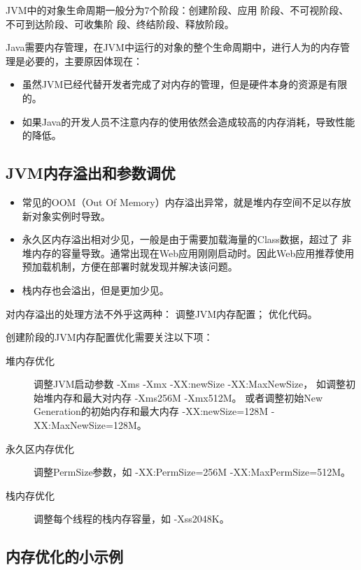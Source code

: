 JVM中的对象生命周期一般分为7个阶段：创建阶段、应用
阶段、不可视阶段、不可到达阶段、可收集阶
段、终结阶段、释放阶段。

Java需要内存管理，在JVM中运行的对象的整个生命周期中，进行人为的内存管理是必要的，主要原因体现在：

\begin{itemize}
\item 虽然JVM已经代替开发者完成了对内存的管理，但是硬件本身的资源是有限的。
\item 如果Java的开发人员不注意内存的使用依然会造成较高的内存消耗，导致性能的降低。
\end{itemize}

\subsection{JVM内存溢出和参数调优}


\begin{itemize}
\item 常见的OOM（Out Of Memory）内存溢出异常，就是堆内存空间不足以存放
  新对象实例时导致。
\item 永久区内存溢出相对少见，一般是由于需要加载海量的Class数据，超过了
  非堆内存的容量导致。通常出现在Web应用刚刚启动时。因此Web应用推荐使用
  预加载机制，方便在部署时就发现并解决该问题。
 \item 栈内存也会溢出，但是更加少见。
\end{itemize}

对内存溢出的处理方法不外乎这两种： 调整JVM内存配置； 优化代码。

创建阶段的JVM内存配置优化需要关注以下项：

\begin{description}
\item[堆内存优化] 调整JVM启动参数 -Xms -Xmx -XX:newSize -XX:MaxNewSize，
  如调整初始堆内存和最大对内存 -Xms256M -Xmx512M。 或者调整初始New
  Generation的初始内存和最大内存 -XX:newSize=128M -XX:MaxNewSize=128M。
\item[永久区内存优化] 调整PermSize参数，如 -XX:PermSize=256M
  -XX:MaxPermSize=512M。
 \item[栈内存优化] 调整每个线程的栈内存容量，如 -Xss2048K。
\end{description}

\subsection{内存优化的小示例}

